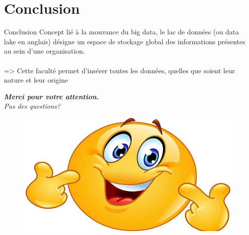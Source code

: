 \section*{Conclusion}
\begin{frame}{Conclusion}
    Concept lié à la mouvance du big data, le lac de données (ou data lake en anglais) désigne un espace de stockage global des informations présentes au sein d'une organisation. \\~\\
    => Cette faculté permet d'insérer toutes les données, quelles que soient leur nature et leur origine
\end{frame}
\begin{frame}
  \centering \Large
  \emph{
  \textbf {Merci pour votre attention.} \\
    Pas des questions?
    }
    \vspace{0.4cm}
     \begin{figure}
        \includegraphics[scale=0.1]{figures/smile.jpg}
	\end{figure}
\end{frame}